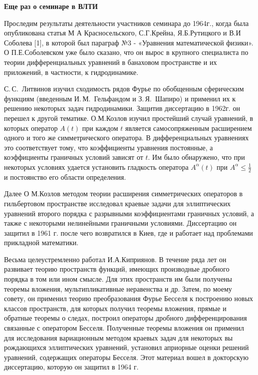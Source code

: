 {\bf Еще раз о семинаре в ВЛТИ}

Проследим результаты деятельности участников семинара до 1964г., когда была опубликована статья М А Красносельского, С.Г.Крейна, Я.Б.Рутицкого и В.И Соболева [1], в которой был параграф №3 - «Уравнения математической физики». О П.Е.Соболевском уже было сказано, что он вырос в крупного
специалиста по теории дифференциальных уравнений в банаховом пространстве и их приложений, в частности, к гидродинамике.

С.\,С.~Литвинов изучил сходимость рядов Фурье по обобщенным сферическим функциям
(введенным И.\,М.~Гель\-фа\-н\-дом и З.\,Я.~Шапиро) и применил их к решению некоторых задач гидродинамики. Защитив диссертацию в 1962г. он перешел к другой тематике. О.М.Козлов изучил простейший случай уравнений, в которых оператор $A(t)$ при каждом $t$ является самосопряженным расширением одного и того же симметрического оператора. В дифференциальных уравнениях это соответствует тому, что коэффициенты уравнения постоянные, а коэффициенты граничных условий зависят от $t$. Им было обнаружено, что при некоторых условиях удается установить гладкость оператора $A^{\alpha}(t)$ при $A^{\alpha} \le \frac{1}{2}$  и постоянство его области определения.

Далее О М.Козлов методом теории расширения симметрических операторов в гильбертовом пространстве исследовал краевые задачи для эллиптических уравнений второго порядка с разрывными коэффициентами граничных условий, а также с некоторыми нелинейными граничными условиями. Диссертацию он защитил в 1961 г. после чего возвратился в Киев, где и работает над проблемами прикладной математики.

Весьма целеустремленно работал И.А.Киприянов. В течение ряда лет он развивает теорию пространств функций, имеющих производные дробного порядка в том или ином смысле. Для этих пространств им были получены теоремы вложения, мультипликативные неравенства и др. Затем, по моему совету, он применил теорию преобразования Фурье Бесселя к построению новых классов пространств, для которых получил теоремы вложения, прямые и обратные теоремы о следах, построил операторы дробного дифференцирования связанные с оператором Бесселя. Полученные теоремы вложения он применил для исследования вариационным методом краевых задач для некоторых вы рождающихся эллиптических уравнений, установил априорные оценки решений уравнений, содержащих операторы Бесселя. Этот материал вошел в докторскую диссертацию, которую он защитил в 1964 г.

